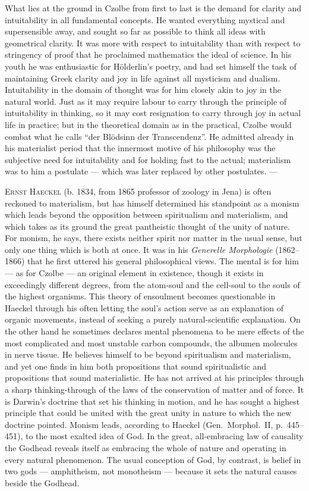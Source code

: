 \documentclass[12pt,a4paper]{book}
\newcommand{\opage}[1]{\marginnote{\footnotesize\textit{[#1]}}}
\begin{document}
What lies at the ground in Czolbe from first to last is \opage{507}the demand for clarity
and intuitability in all fundamental concepts. He wanted everything mystical and
supersensible away, and sought so far as possible to think all ideas with
geometrical clarity. It was more with respect to intuitability than with respect
to stringency of proof that he proclaimed mathematics the ideal of science. In
his youth he was enthusiastic for Hölderlin's poetry, and had set himself the
task of maintaining Greek clarity and joy in life against all mysticism and
dualism. Intuitability in the domain of thought was for him closely akin to joy
in the natural world. Just as it may require labour to carry through the
principle of intuitability in thinking, so it may cost resignation to carry
through joy in actual life in practice; but in the theoretical domain as in the
practical, Czolbe would combat what he calls ``der Blödsinn der Transcendenz''.
He admitted already in his materialist period that the innermost motive of his
philosophy was the subjective need for intuitability and for holding fast to the
actual; materialism was to him a postulate --- which was later replaced by other
postulates. ---

\textsc{Ernst Haeckel} (b. 1834, from 1865 professor of zoology in Jena) is
often reckoned to materialism, but has himself determined his standpoint as a
monism which leads beyond the opposition between spiritualism and materialism,
and which takes as its ground the great pantheistic thought of the unity of
nature. For monism, he says, there exists neither spirit nor matter in the usual
sense, but only one thing which is both at once. It was in his \textit{Generelle
Morphologie} (1862--1866) that he first uttered his general philosophical views.
The mental is for him --- as for Czolbe --- an original element in existence,
though it exists in exceedingly different degrees, from the atom-soul and the
cell-soul to the souls of the highest organisms. This theory of ensoulment
becomes questionable in Haeckel through his often letting the soul's action
serve as an explanation of organic movements, instead of seeking a purely
natural-scientific explanation. On the other hand he sometimes declares mental
phenomena to be mere effects of the most complicated and most unstable carbon
compounds, the \opage{508}albumen molecules in nerve tissue. He believes himself to be
beyond spiritualism and materialism, and yet one finds in him both propositions
that sound spiritualistic and propositions that sound materialistic. He has not
arrived at his principles through a sharp thinking-through of the laws of the
conservation of matter and of force. It is Darwin's doctrine that set his
thinking in motion, and he has sought a highest principle that could be united
with the great unity in nature to which the new doctrine pointed. Monism leads,
according to Haeckel (Gen.\ Morphol.\ II, p.~445--451), to the most exalted idea
of God. In the great, all-embracing law of causality the Godhead reveals itself
as embracing the whole of nature and operating in every natural phenomenon. The
usual conception of God, by contrast, is belief in two gods --- amphitheism, not
monotheism --- because it sets the natural causes beside the Godhead.
\end{document}

